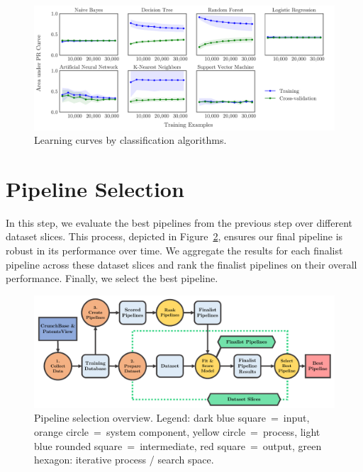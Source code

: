 \documentclass[../thesis/thesis.tex]{subfiles}
\begin{document}
\begin{figure}[!htb]
    \centering
    \includegraphics[width=\textwidth]{../figures/design/learning_curves_classifier}
    \caption[Learning curves by classification algorithms]{Learning curves by classification algorithms.}
    \label{fig:design:create_learning_curves}
\end{figure}

\section{Pipeline Selection}

In this step, we evaluate the best pipelines from the previous step over different dataset slices. This process, depicted in Figure~\ref{fig:design:pipeline_selection}, ensures our final pipeline is robust in its performance over time. We aggregate the results for each finalist pipeline across these dataset slices and rank the finalist pipelines on their overall performance. Finally, we select the best pipeline.

\begin{figure}[!htb]
    \centering
    \includegraphics[width=\textwidth]{../figures/design/flowchart_pipeline_selection}
    \caption[Pipeline selection flowchart]{Pipeline selection overview. Legend: dark blue square~=~input, orange circle~=~system component, yellow circle~=~process, light blue rounded square~=~intermediate, red square~=~output, green hexagon: iterative process / search space.}
    \label{fig:design:pipeline_selection}
\end{figure}
\end{document}
